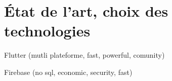 \section{État de l'art, choix des technologies}

Flutter (mutli plateforme, fast, powerful, comunity)

Firebase (no sql, economic, security, fast)
